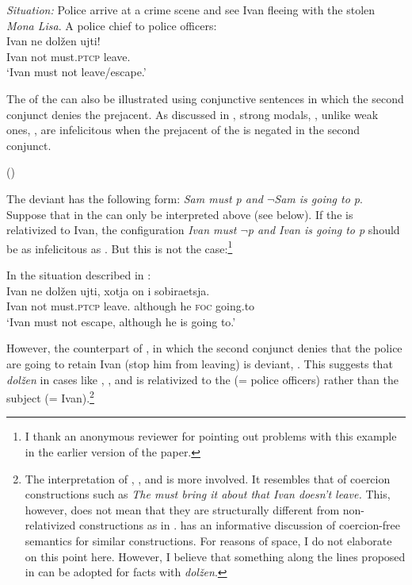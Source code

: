 \documentclass[output=paper,newtxmath,colorlinks,citecolor=brown]{langsci/langscibook}
\begin{document}
\ea \label{relat} \textit{Situation:} Police arrive at a crime scene and see Ivan fleeing with the stolen \emph{Mona Lisa}. A police chief to police officers:\\[5pt]
	{\gll  Ivan ne dolžen ujti!\\
	Ivan  not must.\textsc{ptcp} leave.\p \\
	\glt `Ivan must not leave/escape.'}
	\z

\noindent The  of the   can also be illustrated using conjunctive sentences in which the second conjunct denies the prejacent. As discussed in \citet{nin05}, strong  modals, , unlike weak ones, , are infelicitous when the prejacent of the  is negated in the second conjunct.

\ea \label{conjstr}  \label{conjstr-a}
	\label{conjstr-b}
     \hfill (\citealt[2]{nin05})
        \z \z

\noindent The deviant  has the following form: \textit{Sam must p and $\neg$Sam is going to p}. Suppose that in  the  can only be interpreted above  (see below). If the  is relativized to Ivan, the configuration \textit{Ivan must $\neg$p and Ivan is going to p} should be as infelicitous as . But this is not the case:\footnote{I thank an anonymous reviewer for pointing out problems with this example in the earlier version of the paper.
}

\ea In the situation described in : \\
	{\gll Ivan ne dolžen ujti, xotja on i sobiraetsja. \\
    Ivan not must.\textsc{ptcp} {leave.\p}  although he \textsc{foc}  going.to \\
    \glt `Ivan must not escape, although he is going to.'\label{conjivan}}
	\z

\noindent However, the counterpart of , in which the second conjunct denies that the police are going to retain Ivan (stop him from leaving) is deviant, . This suggests that \textit{dolžen} in cases like    , , and  is relativized to the  (= police officers)  rather than the subject (= Ivan).\footnote{The interpretation of , , and  is more involved. It resembles that of coercion constructions such as \textit{The  must bring it about that Ivan doesn't leave.} This, however, does not mean that they are structurally different from non-relativized constructions as in . \cite{gra17} has an informative discussion of coercion-free semantics for similar constructions. For reasons of space, I do not elaborate on this point here. However, I believe that something along the lines proposed in \cite{gra17} can be adopted for  facts with \textit{dolžen}.
}
\end{document}
